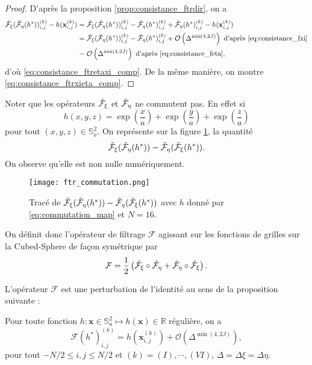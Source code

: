 \begin{proof}
D'après la proposition \ref{prop:consistance_ftrdir}, on a
\begin{align*}
\tilde{\mathcal{F}}_{\xi}(\tilde{\mathcal{F}}_{\eta} (h^*) )_{i,j}^{(k)} - h(\mathbf{x}_{i,j}^{(k)}) & = \tilde{\mathcal{F}}_{\xi}(\tilde{\mathcal{F}}_{\eta} (h^*) )_{i,j}^{(k)} - \tilde{\mathcal{F}}_{\eta}(h^*)_{i,j}^{(k)} + \tilde{\mathcal{F}}_{\eta}(h^*)_{i,j}^{(k)} - h(\mathbf{x}_{i,j}^{(k)})\\
	& = \tilde{\mathcal{F}}_{\xi}(\tilde{\mathcal{F}}_{\eta} (h^*) )_{i,j}^{(k)} - \tilde{\mathcal{F}}_{\eta}(h^*)_{i,j}^{(k)} + \mathcal{O} \left( \Delta^{\min(4,2J)} \right) \text{ d'après \eqref{eq:consistance_fxi}}\\
	& = \mathcal{O} \left( \Delta^{\min(4,2J)} \right) \text{ d'après \eqref{eq:consistance_feta}},
\end{align*}
d'où \eqref{eq:consistance_ftretaxi_comp}.
De la même manière, on montre \eqref{eq:consistance_ftrxieta_comp}.
\end{proof}

Noter que les opérateurs $\tilde{\mathcal{F}}_{\xi}$ et $\tilde{\mathcal{F}}_{\eta}$ ne commutent pas. En effet si 
\begin{equation}
h(x,y,z) = \exp \left( \dfrac{x}{a} \right) + \exp \left( \dfrac{y}{a} \right) + \exp \left( \dfrac{z}{a} \right)
\label{eq:commutation_map}
\end{equation}
pour tout $(x,y,z) \in \mathbb{S}_a^2$. On représente sur la figure \ref{fig:commutation_map}, la quantité
\begin{equation}
\tilde{\mathcal{F}}_{\xi} (\tilde{\mathcal{F}}_{\eta}(h^*))-\tilde{\mathcal{F}}_{\eta} (\tilde{\mathcal{F}}_{\xi}(h^*)).
\end{equation}
On observe qu'elle est non nulle numériquement.
\begin{figure}[htbp]
\begin{center}
\texttt{[image: ftr\_commutation.png]}
\end{center}
\caption{Tracé de $\tilde{\mathcal{F}}_{\xi} (\tilde{\mathcal{F}}_{\eta}(h^*))-\tilde{\mathcal{F}}_{\eta} (\tilde{\mathcal{F}}_{\xi} (h^*))$ avec $h$ donné par \eqref{eq:commutation_map} et $N=16$.}
\label{fig:commutation_map}
\end{figure}
On définit donc l'opérateur de filtrage $\mathcal{F}$ agissant sur les fonctions de grilles sur la Cubed-Sphere de façon symétrique par
\begin{equation}
\mathcal{F} = \dfrac{1}{2} \left( \tilde{\mathcal{F}}_{\xi} \circ \tilde{\mathcal{F}}_{\eta} + \tilde{\mathcal{F}}_{\eta} \circ \tilde{\mathcal{F}}_{\xi} \right).
\label{eq:operateur_filtrage}
\end{equation}

L'opérateur $\mathcal{F}$ est une perturbation de l'identité au sens de la proposition suivante :
\begin{proposition}
Pour toute fonction $h : \mathbf{x} \in \mathbb{S}_a^2 \mapsto h(\mathbf{x}) \in \mathbb{R}$ régulière, on a 
\begin{equation}
\mathcal{F}(h^*)_{i,j}^{(k)} = h(\mathbf{x}_{i,j}^{(k)}) + \mathcal{O}\left( \Delta^{\min(4,2J)} \right),
\label{eq:operteur_filtrage_cons}
\end{equation}
pour tout $-N/2 \leq i,j \leq N/2$ et $(k) = (I), \cdots , (VI)$, $\Delta = \Delta \xi = \Delta \eta$.
\end{proposition}

